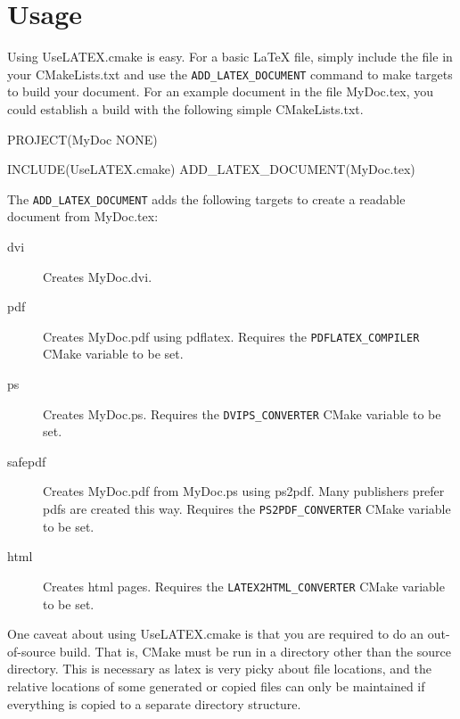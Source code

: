 \documentclass{article}
\newcommand*{\textfile}[1]{\textsf{#1}}
\newcommand*{\textprog}[1]{\textfile{#1}}
\newcommand*{\textcmake}[1]{\texttt{#1}}
\newcommand*{\textcmakevar}[1]{\textcmake{#1}}
\newcommand*{\textmaketarget}[1]{#1}
\newcommand*{\UseLATEX}{\textfile{UseLATEX.cmake}\xspace}
\newcommand*{\latex}{\LaTeX\xspace}
\newcommand*{\ald}{\textcmake{ADD\_LATEX\_DOCUMENT}\xspace}
\begin{document}

  \section{Usage}
  \label{sec:Usage}

  Using \UseLATEX is easy. For a basic \latex file, simply include the file
  in your \textfile{CMakeLists.txt} and use the \ald command to make
  targets to build your document. For an example document in the file
  \textfile{MyDoc.tex}, you could establish a build with the following
  simple \textfile{CMakeLists.txt}.

  \begin{CodeListing}
PROJECT(MyDoc NONE)

INCLUDE(UseLATEX.cmake)
ADD_LATEX_DOCUMENT(MyDoc.tex)
  \end{CodeListing}

  The \ald adds the following targets to create a readable document from
  \textfile{MyDoc.tex}:

  \begin{description}
    \item[\textmaketarget{dvi}] Creates \textfile{MyDoc.dvi}. 
    \item[\textmaketarget{pdf}] Creates \textfile{MyDoc.pdf} using
      \textprog{pdflatex}. Requires the \textcmakevar{PDFLATEX\_COMPILER}
      CMake variable to be set.
    \item[\textmaketarget{ps}] Creates \textfile{MyDoc.ps}. Requires the
      \textcmakevar{DVIPS\_CONVERTER} CMake variable to be set.
    \item[\textmaketarget{safepdf}] Creates \textfile{MyDoc.pdf} from
      \textfile{MyDoc.ps} using \textprog{ps2pdf}. Many publishers prefer
      pdfs are created this way. Requires the
      \textcmakevar{PS2PDF\_CONVERTER} CMake variable to be set.
    \item[\textmaketarget{html}] Creates html pages. Requires the
      \textcmakevar{LATEX2HTML\_CONVERTER} CMake variable to be set.
  \end{description}

  One caveat about using \UseLATEX is that you are required to do an
  out-of-source build. That is, CMake must be run in a directory other than
  the source directory. This is necessary as latex is very picky about file
  locations, and the relative locations of some generated or copied files
  can only be maintained if everything is copied to a separate directory
  structure.
\end{document}
